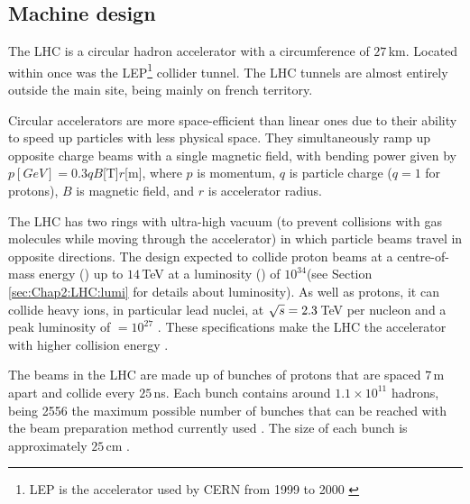 \subsection{Machine design}
The LHC is a circular hadron accelerator with a circumference of $27\,$km. 
Located within once was the LEP\footnote{LEP is the accelerator used 
by CERN from 1999 to 2000 \cite{Myers226776}} collider tunnel.
The LHC tunnels are almost entirely outside the main site, 
being mainly on french territory. %

Circular accelerators are more space-efficient than linear ones due to their ability to speed up 
particles with less physical space. They simultaneously ramp up opposite charge beams with 
a single magnetic field, with bending power given by $p[GeV]=0.3qB$[T]$r$[m], 
where $p$ is momentum, $q$ is particle charge ($q=1$ for protons), $B$ is 
magnetic field, and $r$ is accelerator radius.


The LHC has two rings with ultra-high vacuum (to prevent collisions with gas molecules 
while moving through the accelerator) in which particle beams travel in opposite directions. 
The design expected to collide proton beams at a centre-of-mass energy (\CM) up to $14\,$TeV at 
 a luminosity (\lumi) of $10^{34}$\lumiunits (see Section \ref{sec:Chap2:LHC:lumi} for details about luminosity). As well as protons, it can collide heavy ions, in particular lead nuclei, 
 at $\sqrt{s}=2.3\,$TeV per nucleon and a peak luminosity of \mbox{\lumi$=10^{27}$\lumiunits} \cite{doi:10.1146/annurev-nucl-102711-094910}.
These specifications make the LHC the accelerator with higher \CM collision energy \cite{CERN_LHC_web}. 

The beams in the LHC are made up of bunches of protons that are spaced $7\,$m apart and collide every $25\,$ns. 
Each bunch contains around $1.1 \times 10^{11}$  hadrons, being 2556 the maximum possible 
number of bunches that can be reached with the beam preparation method currently used \cite{steerenberg2019operation}.
The size of each bunch is approximately $25\,$cm \cite{Steerenberg:2621245}.


